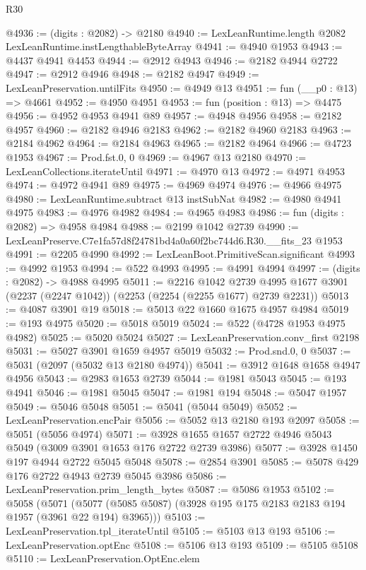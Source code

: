\begin{lexlean}{R30}
\begin{coremodule}
@4936 := (digits : @2082) -> @2180
@4940 := LexLeanRuntime.length @2082 LexLeanRuntime.instLengthableByteArray
@4941 := @4940 @1953
@4943 := @4437 @4941 @4453
@4944 := @2912 @4943
@4946 := @2182 @4944 @2722
@4947 := @2912 @4946
@4948 := @2182 @4947
@4949 := LexLeanPreservation.untilFits
@4950 := @4949 @13
@4951 := fun (__p0 : @13) => @4661
@4952 := @4950 @4951
@4953 := fun (position : @13) => @4475
@4956 := @4952 @4953 @4941 @89
@4957 := @4948 @4956
@4958 := @2182 @4957
@4960 := @2182 @4946 @2183
@4962 := @2182 @4960 @2183
@4963 := @2184 @4962
@4964 := @2184 @4963
@4965 := @2182 @4964
@4966 := @4723 @1953
@4967 := Prod.fst.{0, 0}
@4969 := @4967 @13 @2180
@4970 := LexLeanCollections.iterateUntil
@4971 := @4970 @13
@4972 := @4971 @4953
@4974 := @4972 @4941 @89
@4975 := @4969 @4974
@4976 := @4966 @4975
@4980 := LexLeanRuntime.subtract @13 instSubNat
@4982 := @4980 @4941 @4975
@4983 := @4976 @4982
@4984 := @4965 @4983
@4986 := fun (digits : @2082) => @4958 @4984
@4988 := @2199 @1042 @2739
@4990 := LexLeanPreserve.C7e1fa57d8f24781bd4a0a60f2bc744d6.R30.__fits_23 @1953
@4991 := @2205 @4990
@4992 := LexLeanBoot.PrimitiveScan.significant
@4993 := @4992 @1953
@4994 := @522 @4993
@4995 := @4991 @4994
@4997 := (digits : @2082) -> @4988 @4995
@5011 := @2216
    @1042
    @2739
    @4995
    @1677
    @3901
    (@2237 (@2247 @1042))
    (@2253 (@2254 (@2255 @1677) @2739 @2231))
@5013 := @4087 @3901 @19
@5018 := @5013 @22 @1660 @1675 @4957 @4984
@5019 := @193 @4975
@5020 := @5018 @5019
@5024 := @522 (@4728 @1953 @4975 @4982)
@5025 := @5020 @5024
@5027 := LexLeanPreservation.conv_first @2198
@5031 := @5027 @3901 @1659 @4957 @5019
@5032 := Prod.snd.{0, 0}
@5037 := @5031 (@2097 (@5032 @13 @2180 @4974))
@5041 := @3912 @1648 @1658 @4947 @4956
@5043 := @2983 @1653 @2739
@5044 := @1981 @5043
@5045 := @193 @4941
@5046 := @1981 @5045
@5047 := @1981 @194
@5048 := @5047 @1957
@5049 := @5046 @5048
@5051 := @5041 (@5044 @5049)
@5052 := LexLeanPreservation.encPair
@5056 := @5052 @13 @2180 @193 @2097
@5058 := @5051 (@5056 @4974)
@5071 := @3928 @1655 @1657 @2722 @4946 @5043 @5049 (@3009 @3901 @1653 @176 @2722 @2739 @3986)
@5077 := @3928 @1450 @197 @4944 @2722 @5045 @5048
@5078 := @2854 @3901
@5085 := @5078 @429 @176 @2722 @4943 @2739 @5045 @3986
@5086 := LexLeanPreservation.prim_length_bytes
@5087 := @5086 @1953
@5102 := @5058
    (@5071 (@5077 (@5085 @5087) (@3928 @195 @175 @2183 @2183 @194 @1957 (@3961 @22 @194) @3965)))
@5103 := LexLeanPreservation.tpl_iterateUntil
@5105 := @5103 @13 @193
@5106 := LexLeanPreservation.optEnc
@5108 := @5106 @13 @193
@5109 := @5105 @5108
@5110 := LexLeanPreservation.OptEnc.elem

\end{coremodule}
\end{lexlean}
